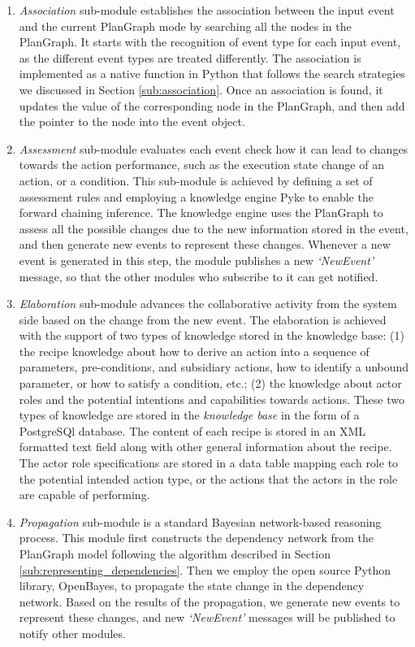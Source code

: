 \begin{enumerate}
	\item \emph{Association} sub-module establishes the association between the input event and the current PlanGraph mode by searching all the nodes in the PlanGraph. It starts with the recognition of event type for each input event, as the different event types are treated differently. The association is implemented as a native function in Python that follows the search strategies we discussed in Section \ref{sub:association}. Once an association is found, it updates the value of the corresponding node in the PlanGraph, and then add the pointer to the node into the event object.
	\item \emph{Assessment} sub-module evaluates each event check how it can lead to changes towards the action performance, such as the execution state change of an action, or a condition. This sub-module is achieved by defining a set of assessment rules and employing a knowledge engine Pyke to enable the forward chaining inference. The knowledge engine uses the PlanGraph to assess all the possible changes due to the new information stored in the event, and then generate new events to represent these changes. Whenever a new event is generated in this step, the module publishes a new \emph{`NewEvent'} message, so that the other modules who subscribe to it can get notified.
	\item \emph{Elaboration} sub-module advances the collaborative activity from the system side based on the change from the new event. The elaboration is achieved with the support of two types of knowledge stored in the knowledge base: (1) the recipe knowledge about how to derive an action into a sequence of parameters, pre-conditions, and subsidiary actions, how to identify a unbound parameter, or how to satisfy a condition, etc.; (2) the knowledge about actor roles and the potential intentions and capabilities towards actions. These two types of knowledge are stored in the \emph{knowledge base} in the form of a PostgreSQl database. The content of each recipe is stored in an XML formatted text field along with other general information about the recipe. The actor role specifications are stored in a data table mapping each role to the potential intended action type, or the actions that the actors in the role are capable of performing.
	\item \emph{Propagation} sub-module is a standard Bayesian network-based reasoning process. This module first constructs the dependency network from the PlanGraph model following the algorithm described in Section \ref{sub:representing_dependencies}. Then we employ the open source Python library, OpenBayes, to propagate the state change in the dependency network. Based on the results of the propagation, we generate new events to represent these changes, and new \emph{`NewEvent'} messages will be published to notify other modules.
\end{enumerate}

